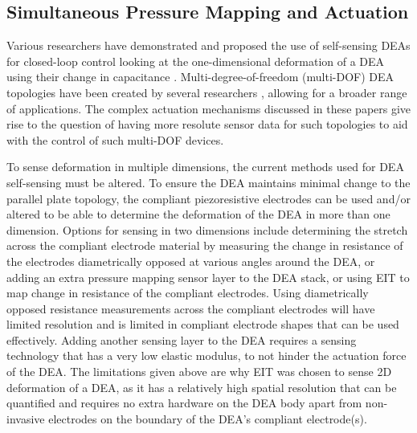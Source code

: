 \subsection{Simultaneous Pressure Mapping and Actuation}
\label{subsec:sensing_and_actuation}
Various researchers have demonstrated and proposed the use of self-sensing DEAs for closed-loop control looking at the one-dimensional deformation of a DEA using their change in capacitance\cite{Gisby2013, Liu2016, Huang2023, Koshiya2023} . Multi-degree-of-freedom (multi-DOF) DEA topologies have been created by several researchers \cite{Nguyen2017, Zhang2024, Zou2023, Pei2004} , allowing for a broader range of applications. The complex actuation mechanisms discussed in these papers give rise to the question of having more resolute sensor data for such topologies to aid with the control of such multi-DOF devices.

To sense deformation in multiple dimensions, the current methods used for DEA self-sensing must be altered. To ensure the DEA maintains minimal change to the parallel plate topology, the compliant piezoresistive electrodes can be used and/or altered to be able to determine the deformation of the DEA in more than one dimension. Options for sensing in two dimensions include determining the stretch across the compliant electrode material by measuring the change in resistance of the electrodes diametrically opposed at various angles around the DEA, or adding an extra pressure mapping sensor layer to the DEA stack, or using EIT to map change in resistance of the compliant electrodes. Using diametrically opposed resistance measurements across the compliant electrodes will have limited resolution and is limited in compliant electrode shapes that can be used effectively. Adding another sensing layer to the DEA requires a sensing technology that has a very low elastic modulus, to not hinder the actuation force of the DEA. The limitations given above are why EIT was chosen to sense 2D deformation of a DEA, as it has a relatively high spatial resolution that can be quantified and requires no extra hardware on the DEA body apart from non-invasive electrodes on the boundary of the DEA's compliant electrode(s).




